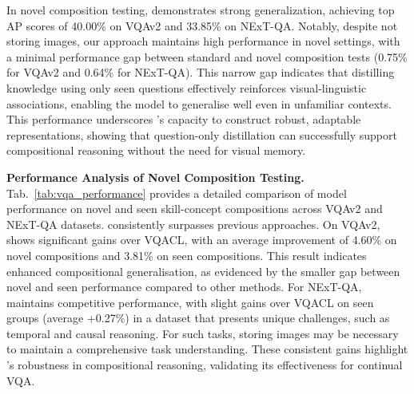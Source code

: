 In novel composition testing, \qstmethodshort{} demonstrates strong generalization, achieving top AP scores of 40.00\% on VQAv2 and 33.85\% on NExT-QA. Notably, despite not storing images, our approach maintains high performance in novel settings, with a minimal performance gap between standard and novel composition tests (0.75\% for VQAv2 and 0.64\% for NExT-QA). This narrow gap indicates that distilling knowledge using only seen questions effectively reinforces visual-linguistic associations, enabling the model to generalise well even in unfamiliar contexts. This performance underscores \qstmethodshort{}'s capacity to construct robust, adaptable representations, showing that question-only distillation can successfully support compositional reasoning without the need for visual memory.




\noindent\textbf{Performance Analysis of Novel Composition Testing. }Tab.~\ref{tab:vqa_performance} provides a detailed comparison of model performance on novel and seen skill-concept compositions across VQAv2 and NExT-QA datasets. \qstmethodshort{} consistently surpasses previous approaches. On VQAv2, \qstmethodshort{} shows significant gains over VQACL, with an average improvement of 4.60\% on novel compositions and 3.81\% on seen compositions. This result indicates enhanced compositional generalisation, as evidenced by the smaller gap between novel and seen performance compared to other methods. For NExT-QA, \qstmethodshort{} maintains competitive performance, with slight gains over VQACL on seen groups (average +0.27\%) in a dataset that presents unique challenges, such as temporal and causal reasoning. For such tasks, storing images may be necessary to maintain a comprehensive task understanding. These consistent gains highlight \qstmethodshort{}'s robustness in compositional reasoning, validating its effectiveness for continual VQA. 

